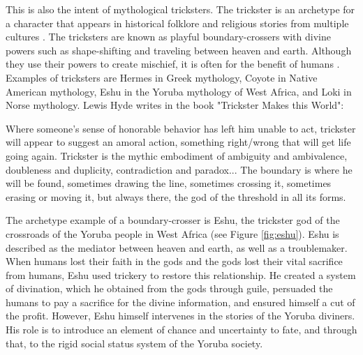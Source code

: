 \documentclass[dissertation,math,vertlayout,pdfa,colorlinks]{aaltoseries}
\begin{document}
This is also the intent of mythological tricksters. The trickster is an archetype for a character that appears in historical folklore and religious stories from multiple cultures \cite{hydeTricksterMakesThis2017}. The tricksters are known as playful boundary-crossers with divine powers such as shape-shifting and traveling between heaven and earth. Although they use their powers to create mischief, it is often for the benefit of humans \cite{hydeTricksterMakesThis1997}. Examples of tricksters are Hermes in Greek mythology, Coyote in Native American mythology, Eshu in the Yoruba mythology of West Africa, and Loki in Norse mythology. Lewis Hyde writes in the book "Trickster Makes this World":
\begin{displayquote}
Where someone’s sense of honorable behavior has left him unable to act, trickster will appear to suggest an amoral action, something right/wrong that will get life going again. Trickster is the mythic embodiment of ambiguity and ambivalence, doubleness and duplicity, contradiction and paradox... The boundary is where he will be found, sometimes drawing the line, sometimes crossing it, sometimes erasing or moving it, but always there, the god of the threshold in all its forms.
\end{displayquote}
The archetype example of a boundary-crosser is Eshu, the trickster god of the crossroads of the Yoruba people in West Africa \cite[ch. 5]{hydeTricksterMakesThis2017} (see Figure \ref{fig:eshu}). Eshu is described as the mediator between heaven and earth, as well as a troublemaker. When humans lost their faith in the gods and the gods lost their vital sacrifice from humans, Eshu used trickery to restore this relationship. He created a system of divination, which he obtained from the gods through guile, persuaded the humans to pay a sacrifice for the divine information, and ensured himself a cut of the profit. However, Eshu himself intervenes in the stories of the Yoruba diviners. His role is to introduce an element of chance and uncertainty to fate, and through that, to the rigid social status system of the Yoruba society. 
\end{document}
